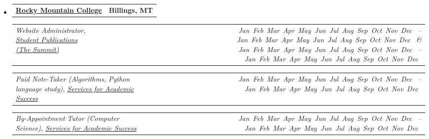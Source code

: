 \documentclass[9pt,letterpaper]{extarticle}
\makeatletter
\newcommand{\headerrow}[2]
{\begin{tabular*}{\linewidth}{l@{\extracolsep{\fill}}r}
	#1 &
	#2 \\
\end{tabular*}}
\newcommand{\DatestampYM}[2]{\mbox{\ShortMonth{#2} #1}}
\newcommand{\ShortMonth}[1]{%
\ifcase#1\relax
\or Jan%
\or Feb%
\or Mar%
\or Apr%
\or May%
\or Jun%
\or Jul%
\or Aug%
\or Sep%
\or Oct%
\or Nov%
\or Dec%
\fi}
\makeatother
\begin{document}
\begin{itemize}
	\item
	\headerrow
		{\textbf{\href{http://www.rocky.edu}{Rocky Mountain College}}}
		{\textbf{Billings, MT}}
	\headerrow
		{\emph{Website Administrator, \href{http://summit.rocky.edu}{Student Publications (The Summit)}}}
		{\emph{\DatestampYM{2013}{01} -- \DatestampYM{2013}{05} \& \DatestampYM{2014}{01} -- \DatestampYM{2014}{05}}}
	\headerrow
		{\emph{Paid Note-Taker (Algorithms, Python language study), \href{https://www.rocky.edu/academics/academic-support/services-academic-success}{Services for Academic Success}}}
		{\emph{\DatestampYM{2013}{09} -- \DatestampYM{2013}{12}}}
	\headerrow
		{\emph{By-Appointment Tutor (Computer Science), \href{https://www.rocky.edu/academics/academic-support/services-academic-success}{Services for Academic Success}}}
		{\emph{\DatestampYM{2012}{09} -- \DatestampYM{2014}{05}}}

\end{itemize}
\end{document}
